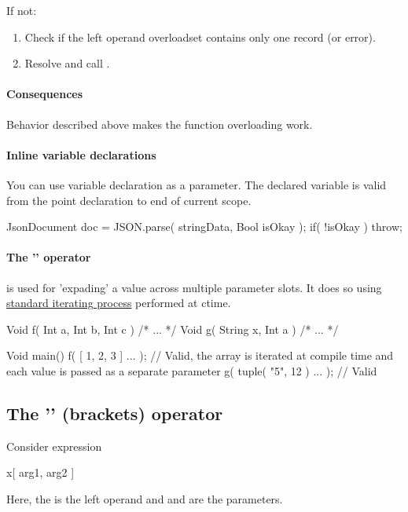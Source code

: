 If not:
\begin{enumerate}
	\item Check if the left operand overloadset contains only one record (or error).
	\item Resolve and call .
\end{enumerate}

\paragraph{Consequences}
Behavior described above makes the function overloading work.

\paragraph{Inline variable declarations}
You can use variable declaration as a parameter. The declared variable is valid from the point declaration to end of current scope.
\begin{code}
{
	JsonDocument doc = JSON.parse( stringData, Bool isOkay );
	if( !isOkay )
		throw;
}
\end{code}

\paragraph{The '' operator} is used for 'expading' a value across multiple parameter slots. It does so using \hyperref[iterators]{standard iterating process} performed at ctime.
\begin{code}
Void f( Int a, Int b, Int c ) { /* ... */ }
Void g( String x, Int a ) { /* ... */ }

Void main() {
	f( [ 1, 2, 3 ] ... ); // Valid, the array is iterated at compile time and each value is passed as a separate parameter
	g( tuple( "5", 12 ) ... ); // Valid
}
\end{code}

\subsection{The '' (brackets) operator}
Consider expression
\begin{code}
	x[ arg1, arg2 ]
\end{code}

Here, the  is the left operand and  and  are the parameters.


